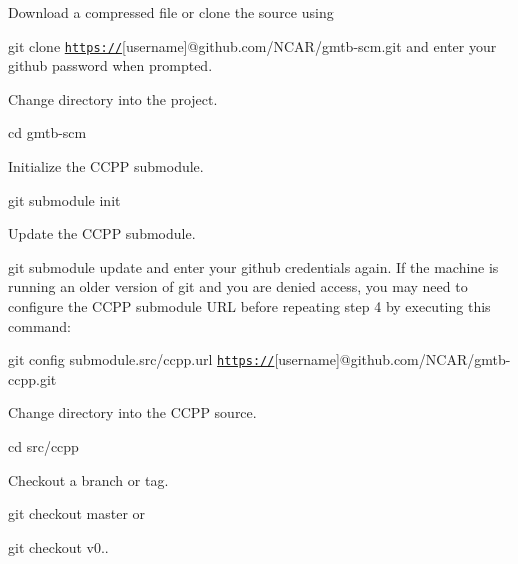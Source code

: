 \begin{DoxyEnumerate}
\item Download a compressed file or clone the source using
\end{DoxyEnumerate}
\begin{DoxyItemize}
\item {\ttfamily git clone \href{https://}{\tt https\+://}\mbox{[}username\mbox{]}@github.\+com/\+N\+C\+A\+R/gmtb-\/scm.git} and enter your github password when prompted.
\end{DoxyItemize}
\begin{DoxyEnumerate}
\item Change directory into the project.
\end{DoxyEnumerate}
\begin{DoxyItemize}
\item {\ttfamily cd gmtb-\/scm}
\end{DoxyItemize}
\begin{DoxyEnumerate}
\item Initialize the C\+C\+PP submodule.
\end{DoxyEnumerate}
\begin{DoxyItemize}
\item {\ttfamily git submodule init}
\end{DoxyItemize}
\begin{DoxyEnumerate}
\item Update the C\+C\+PP submodule.
\end{DoxyEnumerate}
\begin{DoxyItemize}
\item {\ttfamily git submodule update} and enter your github credentials again. If the machine is running an older version of git and you are denied access, you may need to configure the C\+C\+PP submodule U\+RL before repeating step 4 by executing this command\+:
\item {\ttfamily git config submodule.\+src/ccpp.url \href{https://}{\tt https\+://}\mbox{[}username\mbox{]}@github.\+com/\+N\+C\+A\+R/gmtb-\/ccpp.git}
\end{DoxyItemize}
\begin{DoxyEnumerate}
\item Change directory into the C\+C\+PP source.
\end{DoxyEnumerate}
\begin{DoxyItemize}
\item {\ttfamily cd src/ccpp}
\end{DoxyItemize}
\begin{DoxyEnumerate}
\item Checkout a branch or tag.
\end{DoxyEnumerate}
\begin{DoxyItemize}
\item {\ttfamily git checkout master} or
\item {\ttfamily git checkout v0..}
\end{DoxyItemize}

